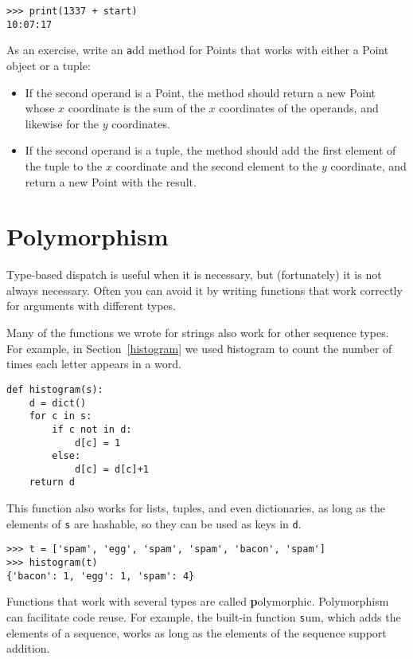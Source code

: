 \documentclass[
DIV=11,
fontsize=12,
twoside,
headinclude=false,
titlepage=firstiscover,
abstract=true,
headsepline=true,
footsepline=true,
chapterprefix=true, %
headings=big,
bibliography=totoc,%
captions=tableheading
]{scrbook}
\theoremstyle{definition}
\begin{document}
\begin{lstlisting}
>>> print(1337 + start)
10:07:17
\end{lstlisting}
%

As an exercise, write an {\texttt add} method for Points that works with
either a Point object or a tuple:

\begin{itemize}

\item If the second operand is a Point, the method should return a new
Point whose $x$ coordinate is the sum of the $x$ coordinates of the
operands, and likewise for the $y$ coordinates.

\item If the second operand is a tuple, the method should add the
first element of the tuple to the $x$ coordinate and the second
element to the $y$ coordinate, and return a new Point with the result. 

\end{itemize}




\section{Polymorphism}
\label{polymorphism}

Type-based dispatch is useful when it is necessary, but (fortunately)
it is not always necessary.  Often you can avoid it by writing functions
that work correctly for arguments with different types.

Many of the functions we wrote for strings also
work for other sequence types.
For example, in Section~\ref{histogram}
we used {\texttt histogram} to count the number of times each letter
appears in a word.

\begin{lstlisting}
def histogram(s):
    d = dict()
    for c in s:
        if c not in d:
            d[c] = 1
        else:
            d[c] = d[c]+1
    return d
\end{lstlisting}
%
This function also works for lists, tuples, and even dictionaries,
as long as the elements of {\texttt s} are hashable, so they can be used
as keys in {\texttt d}.

\begin{lstlisting}
>>> t = ['spam', 'egg', 'spam', 'spam', 'bacon', 'spam']
>>> histogram(t)
{'bacon': 1, 'egg': 1, 'spam': 4}
\end{lstlisting}
%
Functions that work with several types are called {\textbf polymorphic}.
Polymorphism can facilitate code reuse.  For example, the built-in
function {\texttt sum}, which adds the elements of a sequence, works
as long as the elements of the sequence support addition.
\end{document}
